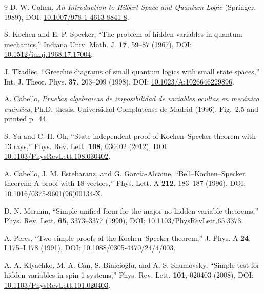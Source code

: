 \documentclass[11pt]{article}
\begin{document}
\begin{thebibliography}{9}
D. W. Cohen, \emph{An Introduction to Hilbert Space and Quantum Logic}
(Springer, 1989), DOI: \href{https://doi.org/10.1007/978-1-4613-8841-8}{10.1007/978-1-4613-8841-8}.

S. Kochen and E. P. Specker, ``The problem of hidden variables in quantum
mechanics,'' Indiana Univ. Math. J. \textbf{17}, 59--87 (1967), DOI:
\href{https://doi.org/10.1512/iumj.1968.17.17004}{10.1512/iumj.1968.17.17004}.

J. Tkadlec, ``Greechie diagrams of small quantum logics with small state
spaces,'' Int. J. Theor. Phys. \textbf{37}, 203--209 (1998), DOI:
\href{https://doi.org/10.1023/A:1026646229896}{10.1023/A:1026646229896}.

A. Cabello, \emph{Pruebas algebraicas de imposibilidad de variables ocultas en
mec\'anica cu\'antica}, Ph.D. thesis, Universidad Complutense de Madrid (1996),
Fig.~2.5 and printed p.~44.

S. Yu and C. H. Oh, ``State-independent proof of Kochen--Specker theorem with
13 rays,'' Phys. Rev. Lett. \textbf{108}, 030402 (2012), DOI:
\href{https://doi.org/10.1103/PhysRevLett.108.030402}{10.1103/PhysRevLett.108.030402}.

A. Cabello, J. M. Estebaranz, and G. Garc\'ia-Alcaine, ``Bell--Kochen--Specker
theorem: A proof with 18 vectors,'' Phys. Lett. A \textbf{212}, 183--187
(1996), DOI:
\href{https://doi.org/10.1016/0375-9601(96)00134-X}{10.1016/0375-9601(96)00134-X}.

D. N. Mermin, ``Simple unified form for the major no-hidden-variable
theorems,'' Phys. Rev. Lett. \textbf{65}, 3373--3377 (1990), DOI:
\href{https://doi.org/10.1103/PhysRevLett.65.3373}{10.1103/PhysRevLett.65.3373}.

A. Peres, ``Two simple proofs of the Kochen--Specker theorem,'' J. Phys. A
\textbf{24}, L175--L178 (1991), DOI:
\href{https://doi.org/10.1088/0305-4470/24/4/003}{10.1088/0305-4470/24/4/003}.

A. A. Klyachko, M. A. Can, S. Binicio\u{g}lu, and A. S. Shumovsky, ``Simple
test for hidden variables in spin-1 systems,'' Phys. Rev. Lett. \textbf{101},
020403 (2008), DOI:
\href{https://doi.org/10.1103/PhysRevLett.101.020403}{10.1103/PhysRevLett.101.020403}.
\end{thebibliography}
\end{document}
